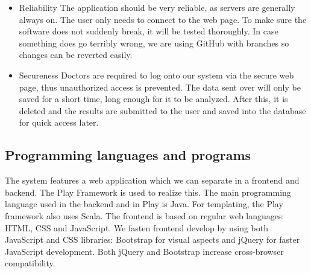 \begin{itemize}
		\item Reliability
			\subitem The application should be very reliable, as servers are generally always on. The user only needs to connect to the web page. To make sure the software does not suddenly break, it will be tested thoroughly. In case something does go terribly wrong, we are using GitHub with branches so changes can be reverted easily.
		\item Secureness
			\subitem Doctors are required to log onto our system via the secure web page, thus unauthorized access is prevented. The data sent over will only be saved for a short time, long enough for it to be analyzed. After this, it is deleted and the results are submitted to the user and saved into the database for quick access later.
	\end{itemize}
	\subsection{Programming languages and programs}
	The system features a web application which we can separate in a frontend and backend. The Play Framework is used to realize this. The main programming language used in the backend and in Play is Java. For templating, the Play framework also uses Scala. The frontend is based on regular web languages: HTML, CSS and JavaScript. We fasten frontend develop by using both JavaScript and CSS libraries: Bootstrap for visual aspects and jQuery for faster JavaScript development. Both jQuery and Bootstrap increase cross-browser compatibility.